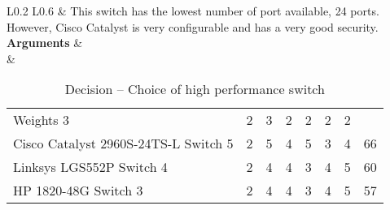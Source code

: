\begin{table}[H]
\begin{tabular}{L{0.2\textwidth} L{0.6\textwidth}}
		& This switch has the lowest number of port available, 24 ports. However, Cisco Catalyst is very configurable and has a very good security. \\
		\midrule
		\textbf{Arguments}      & \\
		&   \begin{tabular}{l|llllll|l}
		                                      & \rot{Reliability} & \rot{Performance} & \rot{Interoperability} & \rot{Security} & \rot{Scalability} & \rot{Cost} & \rot{\textbf{Score}} \\ \hline
		Weights                             3 & 2 & 3 & 2 & 2 & 2 & 2 \\ \hline
		Cisco Catalyst 2960S-24TS-L Switch  5 & 2                 & 5                 & 4                      & 5              & 3                 & 4          & 66                   \\ 
		Linksys LGS552P Switch              4 & 2                 & 4                 & 4                      & 3              & 4                 & 5          & 60                   \\
		HP 1820-48G Switch                  3 & 2                 & 4                 & 4                      & 3              & 4                 & 5          & 57                   \\
	\end{tabular} \\
	\\ \bottomrule
	\end{tabular}
	\caption{Decision -- Choice of high performance switch}
	\label{table:switch-selection}
\end{table}